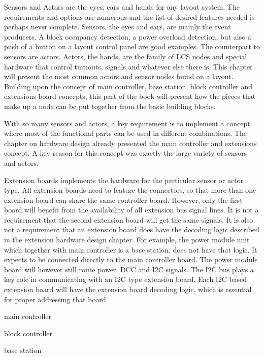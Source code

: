 
Sensors and Actors are the eyes, ears and hands for any layout system. The requirements and options are numerous and the list of desired features needed is perhaps never complete. Sensors, the eyes and ears, are mainly the event producers. A block occupancy detection, a power overload detection, but also a push of a button on a layout control panel are good examples. The counterpart to sensors  are actors. Actors, the hands, are the family of LCS nodes and special hardware that control turnouts, signals and whatever else there is. This chapter will present the most common actors and sensor nodes found on a layout. Building upon the concept of main controller, base station, block controller and extensions board concepts, this part of the book will present how the pieces that make up a node can be put together from the basic building blocks.

With so many sensors and actors, a key requirement is to implement a concept where most of the functional parts can be used in different combinations. The chapter on hardware design already presented the main controller and extensions concept. A key reason for this concept was exactly the large variety of sensors and actors.

Extension boards implements the hardware for the particular sensor or actor type. All extension boards need to feature the connectors, so that more than one extension board can share the same controller board. However, only the first board will benefit from the availability of all extension bus signal lines. It is not a requirement that the second extension board will get the same signals. It is also not a requirement that an extension board does have the decoding logic described in the extension hardware design chapter. For example, the power module unit which together with main controller is a base station, does not have that logic. It expects to be connected directly to the main controller board. The power module board will however still route power, DCC and I2C signals. The I2C bus plays a key role in communicating with an I2C type extension board. Each I2C based extension board will have the extension board decoding logic, which is essential for proper addressing that board.



\begin{smallGapItemize}
\item main controller
\item block controller
\item base station
\end{smallGapItemize}



